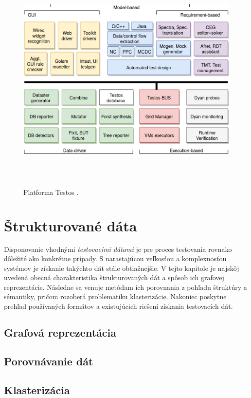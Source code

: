  \begin{figure}[h]\centering
 	\centering
 	\includegraphics[width=6.0in,height=4.2in]{obrazky-figures/testos.png}\\[1pt]
 	\caption{Platforma Testos \cite{Testos}.}
 	\label{testos_img}
 \end{figure} 


\chapter{Štrukturované dáta} 
\label{struktury}

Disponovanie vhodnými \textit{testovacími dátami} je pre proces testovania rovnako dôležité ako konkrétne prípady. S narastajúcou veľkosťou a komplexnosťou systémov je získanie takýchto dát stále obtiažnejšie. V tejto kapitole je najskôj uvedená obecná charakteristika štrukturovaných dát a spôsob ich grafovej reprezentácie. Následne sa venuje metódam ich porovnania z pohľadu štruktúry a sémantiky, pričom rozoberá problematiku klasterizácie. Nakoniec poskytne prehľad používaných formátov a existujúcich riešení získania testovacích dát.

\section{Grafová reprezentácia}
\section{Porovnávanie dát}
\section{Klasterizácia}
